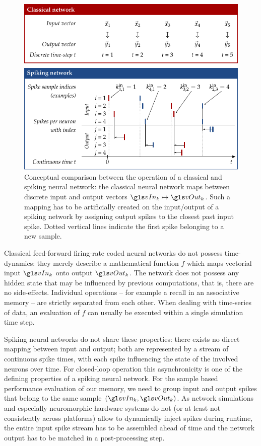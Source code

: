 \begin{figure}
	\centering
	\includegraphics{media/chp3/classical_spiking_comparison.pdf}
	\caption[Comparison between a classical and spiking neural network]{Conceptual comparison between the operation of a classical and spiking neural network: the classical neural network maps between discrete input and output vectors $\vIn_k \mapsto \vOut_k$. Such a mapping has to be artificially created on the input/output of a spiking network by assigning output spikes to the closest past input spike. Dotted vertical lines indicate the first spike belonging to a new sample.}
	\label{fig:classical_spiking_comparison}
\end{figure}

Classical feed-forward firing-rate coded neural networks do not possess time-dynamics: they merely describe a mathematical function $f$ which maps vectorial input $\vIn_k$ onto output $\vOut_k$. The network does not possess any hidden state that may be influenced by previous computations, that is, there are no side-effects. Individual operations -- for example a recall in an associative memory -- are strictly separated from each other. When dealing with time-series of data, an evaluation of $f$ can usually be executed within a single simulation time step.

Spiking neural networks do not share these properties: there exists no direct mapping between input and output; both are represented by a stream of continuous spike times, with each spike influencing the state of the involved neurons over time. For closed-loop operation this asynchronicity is one of the defining properties of a spiking neural network. For the sample based performance evaluation of our memory, we need to group input and output spikes that belong to the same sample $(\vIn_k, \vOut_k)$. As network simulations and especially neuromorphic hardware systems do not (or at least not consistently across platforms) allow to dynamically inject spikes during runtime, the entire input spike stream has to be assembled ahead of time and the network output has to be matched in a post-processing step.

